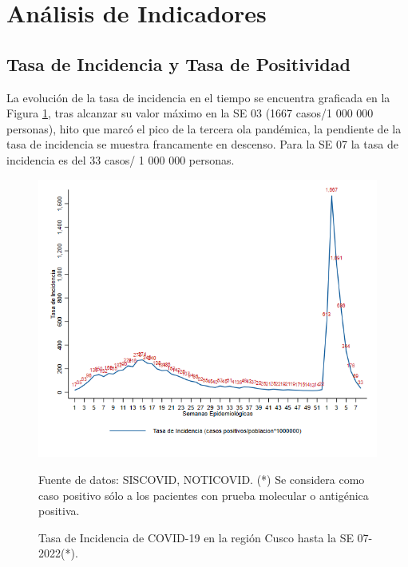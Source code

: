 \documentclass[12pt,a4paper,openany]{book}
\begin{document}

\clearpage

    \section*{Análisis de Indicadores}
   	\subsection*{Tasa de Incidencia y Tasa de Positividad}
\noindent La evolución de la tasa de incidencia en el tiempo se encuentra graficada en la Figura \ref{fig:incidencia}, tras alcanzar su valor máximo en la SE 03 (1667 casos/1 000 000 personas), hito que marcó el pico de la tercera ola pandémica, la pendiente de la tasa de incidencia se muestra francamente en descenso. Para la SE 07 la tasa de incidencia es del 33 casos/ 1 000 000 personas.  

  \begin{figure}[h]
  	\caption{Tasa de Incidencia de COVID-19 en la región Cusco hasta la SE 07-2022(*).  }\label{fig:incidencia}
  	\begin{center}
  		\includegraphics[width=0.80\linewidth]{../figuras/tasa_incidencia_2021_2022.png}
  	\end{center}
  	{\footnotesize {Fuente de datos: SISCOVID, NOTICOVID. (*) Se considera como caso positivo sólo a los pacientes con prueba molecular o antigénica positiva.}}
  \end{figure}
   
\end{document}
